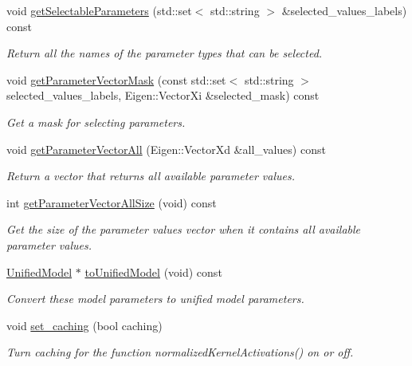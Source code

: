 \begin{DoxyCompactItemize}
void \hyperlink{classDmpBbo_1_1ModelParametersLWR_a887f4747734bd8b7cc4f799092ff31b4}{get\+Selectable\+Parameters} (std\+::set$<$ std\+::string $>$ \&selected\+\_\+values\+\_\+labels) const 
\begin{DoxyCompactList}\small\item\em Return all the names of the parameter types that can be selected. \end{DoxyCompactList}\item 
void \hyperlink{classDmpBbo_1_1ModelParametersLWR_a9dba1f93e426e7511630ec1ece4ace17}{get\+Parameter\+Vector\+Mask} (const std\+::set$<$ std\+::string $>$ selected\+\_\+values\+\_\+labels, Eigen\+::\+Vector\+Xi \&selected\+\_\+mask) const 
\begin{DoxyCompactList}\small\item\em Get a mask for selecting parameters. \end{DoxyCompactList}\item 
void \hyperlink{classDmpBbo_1_1ModelParametersLWR_a29429ff2771d1e56cfba7250d38da4b1}{get\+Parameter\+Vector\+All} (Eigen\+::\+Vector\+Xd \&all\+\_\+values) const 
\begin{DoxyCompactList}\small\item\em Return a vector that returns all available parameter values. \end{DoxyCompactList}\item 
int \hyperlink{classDmpBbo_1_1ModelParametersLWR_ab24d2485b3b795b516f4844f225100eb}{get\+Parameter\+Vector\+All\+Size} (void) const 
\begin{DoxyCompactList}\small\item\em Get the size of the parameter values vector when it contains all available parameter values. \end{DoxyCompactList}\item 
\hyperlink{classDmpBbo_1_1UnifiedModel}{Unified\+Model} $\ast$ \hyperlink{classDmpBbo_1_1ModelParametersLWR_a6e3534f93333334c2f0126f8fc4d29d1}{to\+Unified\+Model} (void) const 
\begin{DoxyCompactList}\small\item\em Convert these model parameters to unified model parameters. \end{DoxyCompactList}\item 
void \hyperlink{classDmpBbo_1_1ModelParametersLWR_a9defb2d398362ff5663a1fde70903651}{set\+\_\+caching} (bool caching)
\begin{DoxyCompactList}\small\item\em Turn caching for the function normalized\+Kernel\+Activations() on or off. \end{DoxyCompactList}\end{DoxyCompactItemize}
